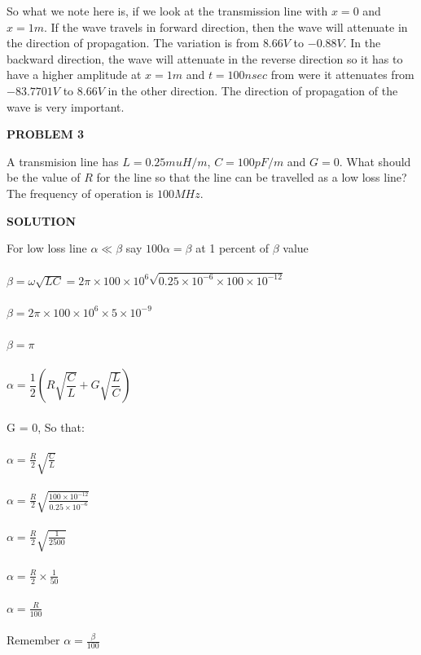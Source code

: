 So what we note here is, if we look at the transmission line with ${x=0}$ and ${x=1m}$. If the wave travels in forward direction, then the wave will attenuate in the direction of propagation. The variation is from ${8.66V}$ to ${-0.88V}$. In the backward direction, the wave will attenuate in the reverse direction so it has to  have a higher amplitude at ${x=1m}$ and ${t=100nsec}$ from were it attenuates from ${-83.7701V}$ to ${8.66V}$ in the other direction. The direction of propagation of the wave is very important.\\
\begin{center}
\textbf{PROBLEM 3}
\end{center}
A transmision line has $L = 0.25muH/m$, $C=100pF/m$ and ${G=0}$. What should be the value of ${R}$ for the line so that the line can be travelled as a low loss line? The frequency of operation is ${100MHz}$.\\
\begin{center}
\textbf{SOLUTION}
\end{center}
For low loss line ${\alpha\ll\beta}$ say ${100\alpha=\beta}$ at 1 percent of ${\beta}$ value\\\\
${\beta=\omega\sqrt{LC}} = {2\pi\times100\times10^6\sqrt{0.25\times10^{-6}\times100\times10^{-12}}}$\\\\
${\beta=2\pi\times100\times10^6\times5\times10^{-9}}$\\\\
${\beta=\pi}$\\\\			${\alpha={\dfrac{1}{2}}(R\sqrt{\dfrac{C}{L}}+G\sqrt{\dfrac{L}{C}})}$\\\\
G = 0, So that:\\\\
${\alpha={\frac{R}{2}}\sqrt{\frac{C}{L}}}$\\\\
${\alpha=\frac{R}{2}\sqrt{\frac{100\times10^{-12}}{0.25\times10^{-6}}}}$\\\\
${\alpha=\frac{R}{2}\sqrt{\frac{1}{2500}}}$\\\\
${\alpha=\frac{R}{2}\times\frac{1}{50}}$\\\\
${\alpha=\frac{R}{100}}$\\\\
Remember 
${\alpha = \frac{\beta}{100}}$\\\\
